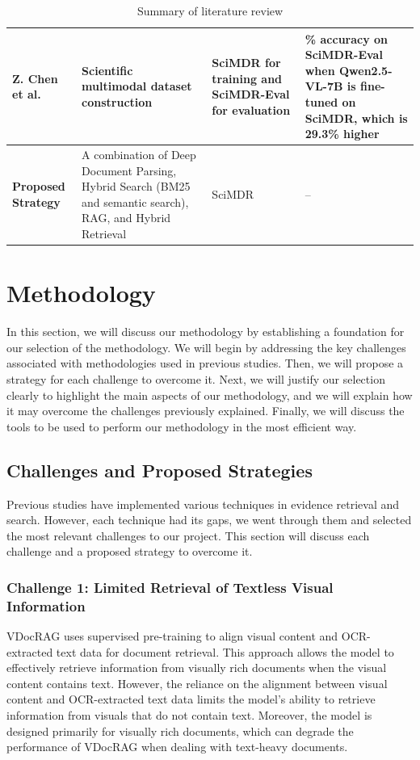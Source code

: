 \documentclass[11pt,a4paper]{report}
\begin{document}
\begin{table}[h]
\begin{tabular}{|>{\raggedright\arraybackslash}p{}|>{\raggedright\arraybackslash}p{}|>{\raggedright\arraybackslash}p{}|>{\raggedright\arraybackslash}p{}|}
        \textbf{Z. Chen et al.} &
        Scientific multimodal dataset construction &
        SciMDR for training and SciMDR-Eval for evaluation &
        49.1\% accuracy on SciMDR-Eval when Qwen2.5-VL-7B is fine-tuned on SciMDR, which is 29.3\% higher \\
        \hline
        \textbf{Proposed Strategy} &
        A combination of Deep Document Parsing, Hybrid Search (\ac{BM25} and semantic search), \ac{RAG}, and Hybrid Retrieval &
        SciMDR~\cite{Chen2026SciMDRAS} &
        -- \\
        \hline
    \end{tabular}
    \caption{Summary of literature review}
    \label{tab:Literature}
\end{table}

\cleardoublepage
\section{Methodology}
In this section, we will discuss our methodology by establishing a foundation for our selection of the methodology. We will begin by addressing the key challenges associated with methodologies used in previous studies. Then, we will propose a strategy for each challenge to overcome it. Next, we will justify our selection clearly to highlight the main aspects of our methodology, and we will explain how it may overcome the challenges previously explained. Finally, we will discuss the tools to be used to perform our methodology in the most efficient way.

\subsection{Challenges and Proposed Strategies}
Previous studies have implemented various techniques in evidence retrieval and search. However, each technique had its gaps, we went through them and selected the most relevant challenges to our project. This section will discuss each challenge and a proposed strategy to overcome it.

\subsubsection{Challenge 1: Limited Retrieval of Textless Visual Information}
VDocRAG \cite{Tanaka2025VDocRAGRG} uses supervised pre-training to align visual content and \ac{OCR}-extracted text data for document retrieval. This approach allows the model to effectively retrieve information from visually rich documents when the visual content contains text. However, the reliance on the alignment between visual content and \ac{OCR}-extracted text data limits the model’s ability to retrieve information from visuals that do not contain text. Moreover, the model is designed primarily for visually rich documents, which can degrade the performance of VDocRAG when dealing with text-heavy documents.\\
\end{document}
